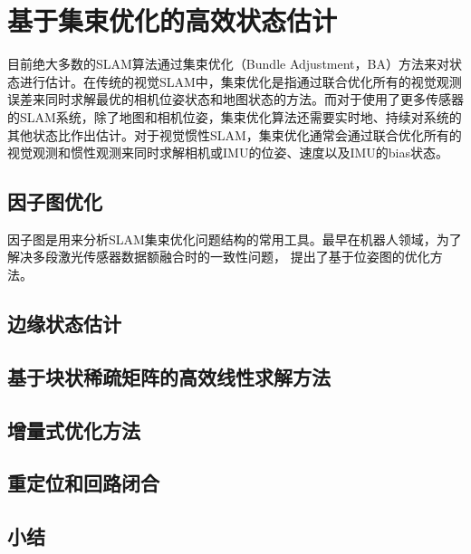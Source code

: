 \chapter{基于集束优化的高效状态估计}

目前绝大多数的SLAM算法通过集束优化\citep{triggs1999bundle}（Bundle Adjustment，BA）方法来对状态进行估计。在传统的视觉SLAM中，集束优化是指通过联合优化所有的视觉观测误差来同时求解最优的相机位姿状态和地图状态的方法。而对于使用了更多传感器的SLAM系统，除了地图和相机位姿，集束优化算法还需要实时地、持续对系统的其他状态比作出估计。对于视觉惯性SLAM，集束优化通常会通过联合优化所有的视觉观测和惯性观测来同时求解相机或IMU的位姿、速度以及IMU的bias状态。

\section{因子图优化}

因子图是用来分析SLAM集束优化问题结构的常用工具。最早在机器人领域，为了解决多段激光传感器数据额融合时的一致性问题，\citep{lu1997globally,lu1997robot} 提出了基于位姿图的优化方法。

\section{边缘状态估计}

\section{基于块状稀疏矩阵的高效线性求解方法}

\section{增量式优化方法}

\section{重定位和回路闭合}

\section{小结}

